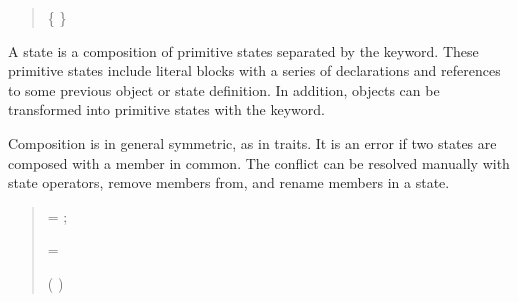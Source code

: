 \begin{quote}


 {}  %


 {} 

 \{  \}

 {} 

\end{quote}

A state is a composition of primitive states separated by the
 keyword.  These primitive states include literal blocks
with a series of declarations and references to some
previous object or state definition. In addition, objects can be transformed into primitive states
with the  keyword. 

Composition is in general symmetric, as in traits.  It is an error if two states are composed with a member in common. The conflict can be resolved manually with state operators, remove members from, and rename members in a state. 



\begin{quote}




 {}  =   ;


 {}

 {}


 {}   = 


 {}  

 {}  





 {}    (  )


 {}  


 {} 

\end{quote}

